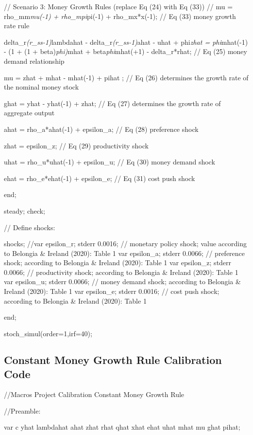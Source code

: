 \documentclass[11pt,preprint, authoryear]{elsarticle}
\numberwithin{equation}{section}
\numberwithin{figure}{section}
\numberwithin{table}{section}
\begin{document}
// Scenario 3: Money Growth Rules (replace Eq (24) with Eq (33)) // mu =
rho\_mm\emph{mu(-1) + rho\_mpi}pi(-1) + rho\_mx*x(-1); // Eq (33) money
growth rate rule

delta\_r\emph{(r\_ss-1)}lambdahat - delta\_r\emph{(r\_ss-1)}ahat - uhat
+ phi\emph{zhat = phi}mhat(-1) - (1 + (1 + beta)\emph{phi)}mhat +
beta\emph{phi}mhat(+1) - delta\_r*rhat; // Eq (25) money demand
relationship

mu = zhat + mhat - mhat(-1) + pihat ; // Eq (26) determines the growth
rate of the nominal money stock

ghat = yhat - yhat(-1) + zhat; // Eq (27) determines the growth rate of
aggregate output

ahat = rho\_a*ahat(-1) + epsilon\_a; // Eq (28) preference shock

zhat = epsilon\_z; // Eq (29) productivity shock

uhat = rho\_u*uhat(-1) + epsilon\_u; // Eq (30) money demand shock

ehat = rho\_e*ehat(-1) + epsilon\_e; // Eq (31) cost push shock

end;

steady; check;

// Define shocks:

shocks; //var epsilon\_r; stderr 0.0016; // monetary policy shock; value
according to Belongia \& Ireland (2020): Table 1 var epsilon\_a; stderr
0.0066; // preference shock; according to Belongia \& Ireland (2020):
Table 1 var epsilon\_z; stderr 0.0066; // productivity shock; according
to Belongia \& Ireland (2020): Table 1 var epsilon\_u; stderr 0.0066; //
money demand shock; according to Belongia \& Ireland (2020): Table 1 var
epsilon\_e; stderr 0.0016; // cost push shock; according to Belongia \&
Ireland (2020): Table 1

end;

stoch\_simul(order=1,irf=40);

\hypertarget{constant-money-growth-rule-calibration-code}{%
\subsection{Constant Money Growth Rule Calibration
Code}\label{constant-money-growth-rule-calibration-code}}

//Macros Project Calibration Constant Money Growth Rule

//Preamble:

var c yhat lambdahat ahat zhat rhat qhat xhat ehat uhat mhat mu ghat
pihat;
\end{document}
